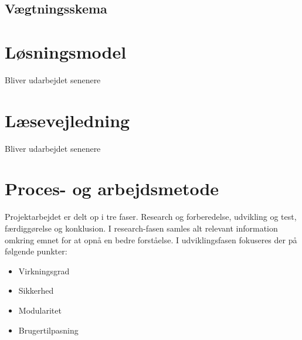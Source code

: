\subsection{Vægtningsskema}

\section{Løsningsmodel}
Bliver udarbejdet senenere

\section{Læsevejledning}
Bliver udarbejdet senenere

\section{Proces- og arbejdsmetode}
Projektarbejdet er delt op i tre faser. Research og forberedelse, udvikling og test, færdiggørelse og konklusion. I research-fasen samles alt relevant information omkring emnet for at opnå en bedre forståelse. I udviklingsfasen fokuseres der på følgende punkter: 
\begin{itemize}
	\item Virkningsgrad
	\item Sikkerhed
	\item Modularitet
	\item Brugertilpasning
\end{itemize}


